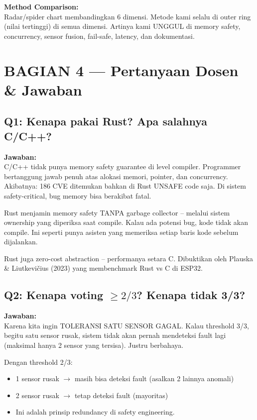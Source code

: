 \documentclass[12pt,a4paper]{article}
\begin{document}
\textbf{Method Comparison:}\\
Radar/spider chart membandingkan 6 dimensi. Metode kami selalu di outer ring
(nilai tertinggi) di semua dimensi. Artinya kami UNGGUL di memory safety,
concurrency, sensor fusion, fail-safe, latency, dan dokumentasi.

\section{BAGIAN 4 --- Pertanyaan Dosen \& Jawaban}

\subsection{Q1: Kenapa pakai Rust? Apa salahnya C/C++?}

\textbf{Jawaban:}\\
C/C++ tidak punya memory safety guarantee di level compiler. Programmer
bertanggung jawab penuh atas alokasi memori, pointer, dan concurrency.
Akibatnya: 186 CVE ditemukan bahkan di Rust UNSAFE code saja. Di sistem
safety-critical, bug memory bisa berakibat fatal.

Rust menjamin memory safety TANPA garbage collector -- melalui sistem ownership
yang diperiksa saat compile. Kalau ada potensi bug, kode tidak akan compile.
Ini seperti punya asisten yang memeriksa setiap baris kode sebelum dijalankan.

Rust juga zero-cost abstraction -- performanya setara C. Dibuktikan oleh
Plauska \& Liutkevi\v{c}ius (2023) yang membenchmark Rust vs C di ESP32.

\subsection{Q2: Kenapa voting $\ge 2/3$? Kenapa tidak 3/3?}

\textbf{Jawaban:}\\
Karena kita ingin TOLERANSI SATU SENSOR GAGAL. Kalau threshold 3/3, begitu
satu sensor rusak, sistem tidak akan pernah mendeteksi fault lagi (maksimal
hanya 2 sensor yang tersisa). Justru berbahaya.

Dengan threshold 2/3:
\begin{itemize}[nosep]
    \item 1 sensor rusak $\rightarrow$ masih bisa deteksi fault (asalkan 2 lainnya anomali)
    \item 2 sensor rusak $\rightarrow$ tetap deteksi fault (mayoritas)
    \item Ini adalah prinsip redundancy di safety engineering.
\end{itemize}
\end{document}
